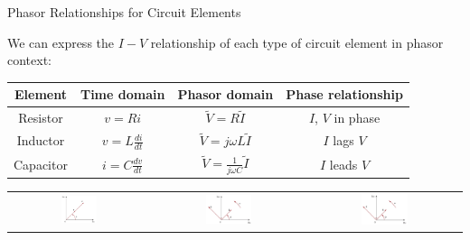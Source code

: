 \documentclass{beamer}
\begin{document}
\begin{frame}{Phasor Relationships for Circuit Elements}

We can express the $I-V$ relationship of each type of circuit element in phasor context:

\begin{table}[]
    \centering
    \begin{tabular}{cccc}
        \toprule
        Element & Time domain & Phasor domain & Phase relationship\\
         \midrule
         Resistor & $v=Ri$& $\tilde{V} = R\tilde{I}$ & $I$, $V$ in phase\\
         Inductor & $v=L\frac{di}{dt}$ & \color{red} $\tilde{V} = j\omega L \tilde{I}$ & \color{red}$I$ lags $V$\\
         Capacitor & $i=C\frac{dv}{dt}$& \color{red}$\tilde{V} = \frac{1}{j \omega C}\tilde{I}$ & \color{red}$I$ leads $V$\\
         
         \bottomrule
    \end{tabular}
\end{table}

\begin{table}[]
    \centering
    \begin{tabular}{ccc}
         \includegraphics[width=0.27\textwidth]{img_ch9/5_phasordiagramR.png}
         & 
        \includegraphics[width=0.32\textwidth]{img_ch9/6_phasordiagramL.png}
         &
        \includegraphics[width=0.32\textwidth]{img_ch9/7_phasordiagramC.png}
         \\
    \end{tabular}
\end{table}

\end{frame}
\end{document}
